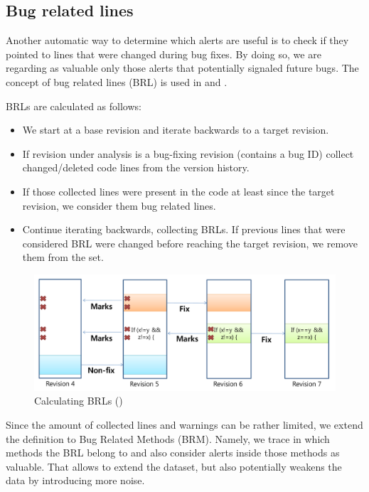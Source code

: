 \subsection{Bug related lines}

Another automatic way to determine which alerts are useful is to check if they pointed to lines that were changed during bug fixes. By doing so, we are regarding as valuable only those alerts that potentially signaled future bugs. The concept of bug related lines (BRL) is used in \cite{which_warnings} and \cite{automatic_training_set}.

BRLs are calculated as follows:
\begin{itemize}
    \item We start at a base revision and iterate backwards to a target revision. 
    \item If revision under analysis is a bug-fixing revision (contains a bug ID) collect changed/deleted code lines from the version history.
    \item If those collected lines were present in the code at least since the target revision, we consider them bug related lines.
    \item Continue iterating backwards, collecting BRLs. If previous lines that were considered BRL were changed before reaching the target revision, we remove them from the set. 
\end{itemize}

\begin{figure}[H]
    \centering
    \includegraphics[scale=0.3]{./src/brl_example.png}
    \caption{Calculating BRLs (\cite{which_warnings})}
\end{figure}


Since the amount of collected lines and warnings can be rather limited, we extend the definition to Bug Related Methods (BRM). Namely, we trace in which methods the BRL belong to and also consider alerts inside those methods as valuable. That allows to extend the dataset, but also potentially weakens the data by introducing more noise.

